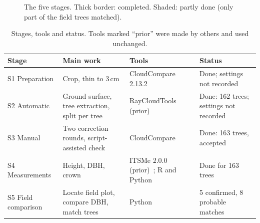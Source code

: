 \documentclass[runningheads]{llncs}
\begin{document}
\begin{figure}[!tb]
\centering
{}
\caption{The five stages. Thick border: completed. Shaded: partly done (only part of the field trees matched).}\label{fig:pipeline}
\end{figure}

\begin{table}[!tb]
\caption{Stages, tools and status. Tools marked ``prior'' were made by others and used unchanged.}\label{tab:stages}
\centering\footnotesize
\begin{tabular}{@{}L{1.95cm}L{3.55cm}L{2.55cm}L{3.0cm}@{}}
\toprule
Stage & Main work & Tools & Status\\
\midrule
S1 Preparation & Crop, thin to 3\,cm & CloudCompare 2.13.2 & Done; settings not recorded\\
S2 Automatic & Ground surface, tree extraction, split per tree & RayCloudTools (prior)~\cite{lowe2021} & Done: 162 trees; settings not recorded\\
S3 Manual & Two correction rounds, script-assisted check & CloudCompare & Done: 163 trees, accepted\\
S4 Measurements & Height, DBH, crown & ITSMe 2.0.0 (prior)~\cite{terryn2023}; R and Python & Done for 163 trees\\
S5 Field comparison & Locate field plot, compare DBH, match trees & Python & 5 confirmed, 8 probable matches\\
\bottomrule
\end{tabular}
\end{table}
\end{document}
